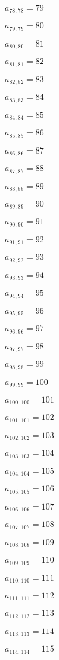 \documentclass[a4paper,12pt]{article}
\begin{document}
$a _{ 78, 78 } = 79$

$a _{ 79, 79 } = 80$

$a _{ 80, 80 } = 81$

$a _{ 81, 81 } = 82$

$a _{ 82, 82 } = 83$

$a _{ 83, 83 } = 84$

$a _{ 84, 84 } = 85$

$a _{ 85, 85 } = 86$

$a _{ 86, 86 } = 87$

$a _{ 87, 87 } = 88$

$a _{ 88, 88 } = 89$

$a _{ 89, 89 } = 90$

$a _{ 90, 90 } = 91$

$a _{ 91, 91 } = 92$

$a _{ 92, 92 } = 93$

$a _{ 93, 93 } = 94$

$a _{ 94, 94 } = 95$

$a _{ 95, 95 } = 96$

$a _{ 96, 96 } = 97$

$a _{ 97, 97 } = 98$

$a _{ 98, 98 } = 99$

$a _{ 99, 99 } = 100$

$a _{ 100, 100 } = 101$

$a _{ 101, 101 } = 102$

$a _{ 102, 102 } = 103$

$a _{ 103, 103 } = 104$

$a _{ 104, 104 } = 105$

$a _{ 105, 105 } = 106$

$a _{ 106, 106 } = 107$

$a _{ 107, 107 } = 108$

$a _{ 108, 108 } = 109$

$a _{ 109, 109 } = 110$

$a _{ 110, 110 } = 111$

$a _{ 111, 111 } = 112$

$a _{ 112, 112 } = 113$

$a _{ 113, 113 } = 114$

$a _{ 114, 114 } = 115$
\end{document}
